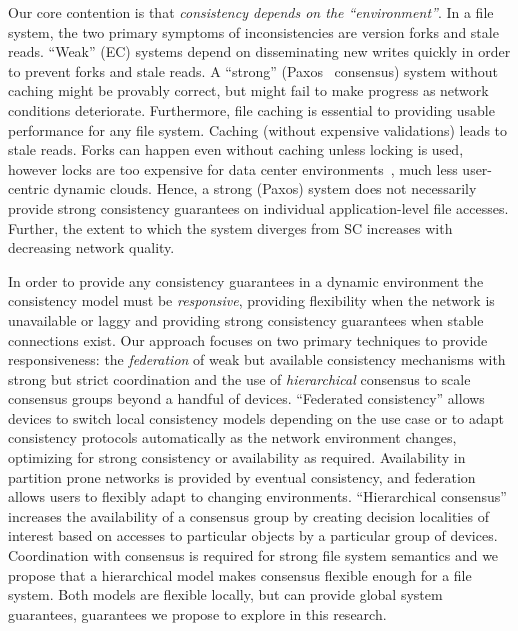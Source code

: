 \documentclass{article}
\newcommand{\pjk}[1]{{\bf
    [\marginpar[\hbox{{\textcolor{blue}{pjk}}\raisebox{0ex}{\Huge $\rightarrow$}}]%
{\hbox{\raisebox{0ex}{\Huge $\leftarrow$}{\textcolor{blue}{pjk}}}}\textcolor{blue}{#1}]}}
\renewcommand{\pjk}[1]{\textcolor{blue}{[#1]}}
\begin{document}
Our core contention is that \emph{consistency depends on the
``environment''}. In a file system, the two primary symptoms of inconsistencies are version forks and stale reads. ``Weak'' (EC) systems depend on disseminating new writes quickly in order to prevent forks and stale reads. A ``strong'' (Paxos~\cite{paxos} consensus) system without caching might be provably correct, but might fail to make progress as network conditions deteriorate. Furthermore, file caching is essential to providing usable performance for any file system. Caching (without expensive validations) leads to stale reads. Forks can happen even without caching unless locking is used, however locks are too expensive for data center environments~\cite{kraska_mdcc:_2013,corbett_spanner:_2013}, much less user-centric dynamic clouds. Hence, a strong (Paxos) system does not necessarily provide strong consistency guarantees on individual application-level file accesses. Further, the extent to which the system diverges from SC increases with decreasing network quality.


In order to provide any consistency guarantees in a dynamic environment the consistency model must be \textit{responsive}, providing flexibility when the network is unavailable or laggy and providing strong consistency guarantees when stable connections exist. Our approach focuses on two primary techniques to provide responsiveness: the \textit{federation} of weak but available consistency mechanisms with strong but strict coordination and the use of \textit{hierarchical} consensus to scale consensus groups beyond a handful of devices. ``Federated consistency'' allows devices to switch local consistency models depending on the use case or to adapt consistency protocols automatically as the network environment changes, optimizing for strong consistency or availability as required. Availability in partition prone networks is provided by eventual consistency, and federation allows users to flexibly adapt to changing environments. ``Hierarchical consensus'' increases the availability of a consensus group by creating decision localities of interest based on accesses to particular objects by a particular group of devices. Coordination with consensus is required for strong file system semantics and we propose that a hierarchical model makes consensus flexible enough for a file system. Both models are flexible locally, but can provide global system guarantees, guarantees we propose to explore in this research.
\end{document}
